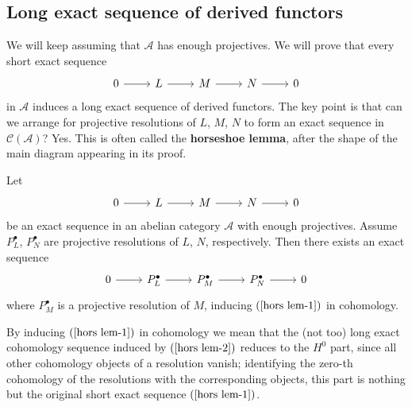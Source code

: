 \subsection{Long exact sequence of derived functors}
We will keep assuming that $\mathcal{A}$ has enough projectives. We will prove that every short exact sequence
\[\begin{tikzcd}
0\ar[r]&L\ar[r]&M\ar[r]&N\ar[r]&0
\end{tikzcd}\]
in $\mathcal{A}$ induces a long exact sequence of derived functors. The key point is that can we arrange for projective resolutions of $L$, $M$, $N$ to form an exact sequence in $\mathcal{C}(\mathcal{A})$? Yes. This is often called the \textbf{horseshoe lemma}, after the shape of the main diagram appearing in its proof.
\begin{lemma}\label{horseshoe lem}
Let
\begin{equation}\label{hors lem-1}
\begin{tikzcd}
0\ar[r]&L\ar[r]&M\ar[r]&N\ar[r]&0
\end{tikzcd}
\end{equation}
be an exact sequence in an abelian category $\mathcal{A}$ with enough projectives. Assume $P^\bullet_L$, $P^\bullet_N$ are projective resolutions of $L$, $N$, respectively. Then there exists an exact sequence
\begin{equation}\label{hors lem-2}
\begin{tikzcd}
0\ar[r]&P^\bullet_L\ar[r]&P^\bullet_M\ar[r]&P^\bullet_N\ar[r]&0
\end{tikzcd}
\end{equation}
where $P^\bullet_M$ is a projective resolution of $M$, inducing $(\ref{hors lem-1})$ in cohomology.
\end{lemma}
By inducing $(\ref{hors lem-1})$ in cohomology we mean that the (not too) long exact cohomology
sequence induced by $(\ref{hors lem-2})$ reduces to the $H^0$ part, since all other cohomology
objects of a resolution vanish; identifying the zero-th cohomology of the resolutions with the corresponding objects, this part is nothing but the original short exact sequence $(\ref{hors lem-1})$.

